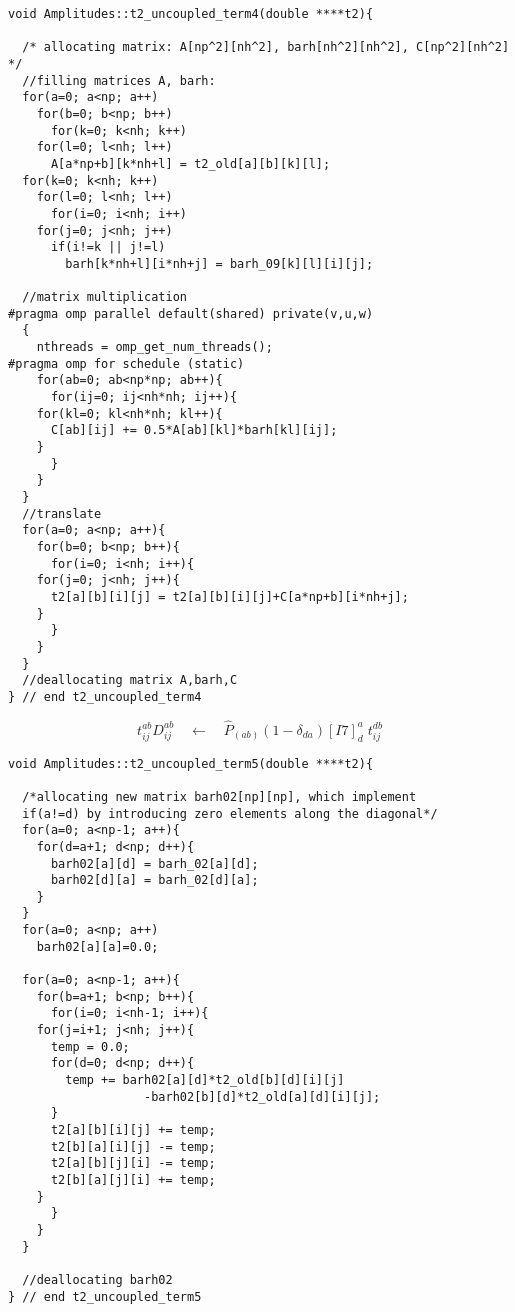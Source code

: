 \begin{lstlisting}[label={list:impl:t2term4},caption={implementation of the amp1 class function t2\_uncoupled\_term4()}]
void Amplitudes::t2_uncoupled_term4(double ****t2){
  
  /* allocating matrix: A[np^2][nh^2], barh[nh^2][nh^2], C[np^2][nh^2]  */
  //filling matrices A, barh:
  for(a=0; a<np; a++)
    for(b=0; b<np; b++)
      for(k=0; k<nh; k++)
	for(l=0; l<nh; l++)
	  A[a*np+b][k*nh+l] = t2_old[a][b][k][l];
  for(k=0; k<nh; k++)
    for(l=0; l<nh; l++)
      for(i=0; i<nh; i++)
	for(j=0; j<nh; j++)
	  if(i!=k || j!=l)
	    barh[k*nh+l][i*nh+j] = barh_09[k][l][i][j];	    

  //matrix multiplication
#pragma omp parallel default(shared) private(v,u,w) 
  {      
    nthreads = omp_get_num_threads();
#pragma omp for schedule (static)
    for(ab=0; ab<np*np; ab++){
      for(ij=0; ij<nh*nh; ij++){
	for(kl=0; kl<nh*nh; kl++){
	  C[ab][ij] += 0.5*A[ab][kl]*barh[kl][ij];
	}
      }
    }
  }
  //translate
  for(a=0; a<np; a++){
    for(b=0; b<np; b++){
      for(i=0; i<nh; i++){
	for(j=0; j<nh; j++){
	  t2[a][b][i][j] = t2[a][b][i][j]+C[a*np+b][i*nh+j];
	}
      }
    }
  }
  //deallocating matrix A,barh,C
} // end t2_uncoupled_term4
\end{lstlisting}
%
\begin{equation*}
t_{ij}^{ab}D_{ij}^{ab}\quad \leftarrow \quad \hat{P}_{(ab)}(1-\delta_{da})[I7]_{d}^{a}\phantom{.}t_{ij}^{db}
\end{equation*}
%
\begin{lstlisting}[label={list:impl:t2term5},caption={implementation of the amp1 class function t2\_uncoupled\_term5()}]
void Amplitudes::t2_uncoupled_term5(double ****t2){

  /*allocating new matrix barh02[np][np], which implement 
  if(a!=d) by introducing zero elements along the diagonal*/
  for(a=0; a<np-1; a++){
    for(d=a+1; d<np; d++){
      barh02[a][d] = barh_02[a][d];
      barh02[d][a] = barh_02[d][a];
    }
  }
  for(a=0; a<np; a++)
    barh02[a][a]=0.0;
  
  for(a=0; a<np-1; a++){
    for(b=a+1; b<np; b++){
      for(i=0; i<nh-1; i++){
	for(j=i+1; j<nh; j++){	
	  temp = 0.0;
	  for(d=0; d<np; d++){
	    temp += barh02[a][d]*t2_old[b][d][i][j]
                   -barh02[b][d]*t2_old[a][d][i][j];
	  }
	  t2[a][b][i][j] += temp;
	  t2[b][a][i][j] -= temp;
	  t2[a][b][j][i] -= temp;
	  t2[b][a][j][i] += temp;
	}
      }
    }
  }
  
  //deallocating barh02
} // end t2_uncoupled_term5
\end{lstlisting}

